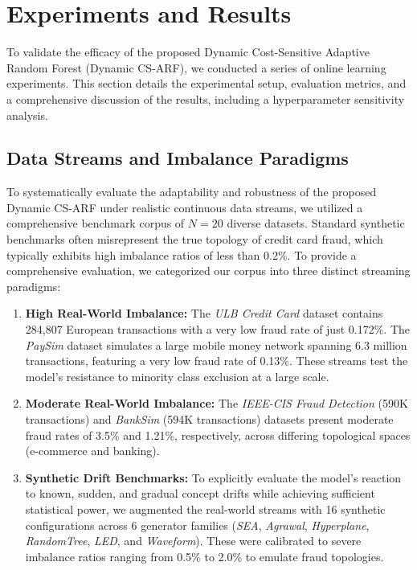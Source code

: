\documentclass[review,12pt]{elsarticle}
\begin{document}
\section{Experiments and Results}
\label{sec:experiments}

To validate the efficacy of the proposed Dynamic Cost-Sensitive Adaptive Random Forest (Dynamic CS-ARF), we conducted a series of online learning experiments. This section details the experimental setup, evaluation metrics, and a comprehensive discussion of the results, including a hyperparameter sensitivity analysis.

\subsection{Data Streams and Imbalance Paradigms}
To systematically evaluate the adaptability and robustness of the proposed Dynamic CS-ARF under realistic continuous data streams, we utilized a comprehensive benchmark corpus of $N=20$ diverse datasets. Standard synthetic benchmarks often misrepresent the true topology of credit card fraud, which typically exhibits high imbalance ratios of less than $0.2\%$. To provide a comprehensive evaluation, we categorized our corpus into three distinct streaming paradigms:
\begin{enumerate}
    \item \textbf{High Real-World Imbalance:} The \textit{ULB Credit Card} dataset \cite{dal2018credit} contains 284,807 European transactions with a very low fraud rate of just 0.172\%. The \textit{PaySim} dataset \cite{lopez2016paysim} simulates a large mobile money network spanning 6.3 million transactions, featuring a very low fraud rate of 0.13\%. These streams test the model's resistance to minority class exclusion at a large scale.
    \item \textbf{Moderate Real-World Imbalance:} The \textit{IEEE-CIS Fraud Detection} \cite{ieee-fraud-detection} (590K transactions) and \textit{BankSim} \cite{lopez2014banksim} (594K transactions) datasets present moderate fraud rates of 3.5\% and 1.21\%, respectively, across differing topological spaces (e-commerce and banking). 
    \item \textbf{Synthetic Drift Benchmarks:} To explicitly evaluate the model's reaction to known, sudden, and gradual concept drifts while achieving sufficient statistical power, we augmented the real-world streams with 16 synthetic configurations across 6 generator families (\textit{SEA}, \textit{Agrawal}, \textit{Hyperplane}, \textit{RandomTree}, \textit{LED}, and \textit{Waveform}). These were calibrated to severe imbalance ratios ranging from 0.5\% to 2.0\% to emulate fraud topologies.
\end{enumerate}
\end{document}
